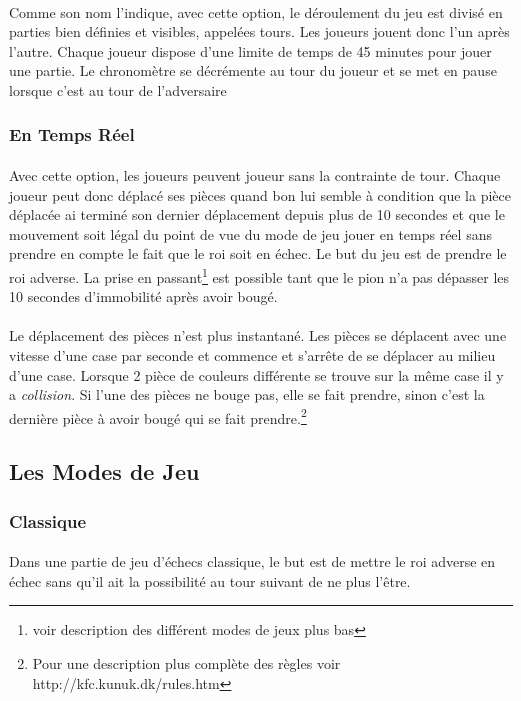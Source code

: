 \documentclass[10pt, a4paper]{article}
\begin{document}
					\paragraph{}Comme son nom l'indique, avec cette option, le déroulement du jeu est divisé en parties bien définies et visibles, appelées tours. Les joueurs jouent donc l'un après l'autre. Chaque joueur dispose d'une limite de temps de 45 minutes pour jouer une partie. Le chronomètre se décrémente au tour du joueur et se met en pause lorsque c'est au tour de l'adversaire
				\subsubsection{En Temps Réel}
					\paragraph{}Avec cette option, les joueurs peuvent joueur sans la contrainte de tour. Chaque joueur peut donc déplacé ses pièces quand bon lui semble à condition que la pièce déplacée ai terminé son dernier déplacement depuis plus de 10 secondes et que le mouvement soit légal du point de vue du mode de jeu jouer en temps réel sans prendre en compte le fait que le roi soit en échec. Le but du jeu est de prendre le roi adverse. La prise en passant\footnote{voir description des différent modes de jeux plus bas} est possible tant que le pion n'a pas dépasser les 10 secondes d'immobilité après avoir bougé.
					\paragraph{}Le déplacement des pièces n'est plus instantané. Les pièces se déplacent avec une vitesse d'une case par seconde et commence et s'arrête de se déplacer au milieu d'une case. Lorsque 2 pièce de couleurs différente se trouve sur la même case il y a \textit{collision}. Si l'une des pièces ne bouge pas, elle se fait prendre, sinon c'est la dernière pièce à avoir bougé qui se fait prendre.\footnote{Pour une description plus complète des règles voir http://kfc.kunuk.dk/rules.htm}
			\subsection{Les Modes de Jeu}
				\subsubsection{Classique}
					\paragraph{}Dans une partie de jeu d'échecs classique, le but est de mettre le roi adverse en échec sans qu'il ait la possibilité au tour suivant de ne plus l'être.
\end{document}
